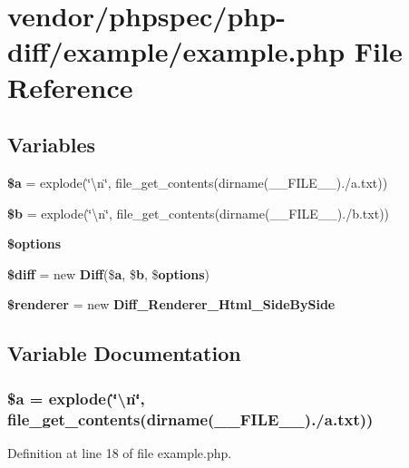 \section{vendor/phpspec/php-\/diff/example/example.php File Reference}
\label{phpspec_2php-diff_2example_2example_8php}
\subsection*{Variables}
\begin{DoxyCompactItemize}
\item 
{\bf \$a} = explode(\char`\"{}\textbackslash{}n\char`\"{}, file\+\_\+get\+\_\+contents(dirname(\+\_\+\+\_\+\+F\+I\+L\+E\+\_\+\+\_\+).\textquotesingle{}/a.\+txt\textquotesingle{}))
\item 
{\bf \$b} = explode(\char`\"{}\textbackslash{}n\char`\"{}, file\+\_\+get\+\_\+contents(dirname(\+\_\+\+\_\+\+F\+I\+L\+E\+\_\+\+\_\+).\textquotesingle{}/b.\+txt\textquotesingle{}))
\item 
{\bf \$options}
\item 
{\bf \$diff} = new {\bf Diff}(\${\bf a}, \${\bf b}, \${\bf options})
\item 
{\bf \$renderer} = new {\bf Diff\+\_\+\+Renderer\+\_\+\+Html\+\_\+\+Side\+By\+Side}
\end{DoxyCompactItemize}


\subsection{Variable Documentation}
\subsubsection[{\$a}]{\setlength{\rightskip}{0pt plus 5cm}\${\bf a} = explode(\char`\"{}\textbackslash{}n\char`\"{}, file\+\_\+get\+\_\+contents(dirname(\+\_\+\+\_\+\+F\+I\+L\+E\+\_\+\+\_\+).\textquotesingle{}/a.\+txt\textquotesingle{}))}\label{phpspec_2php-diff_2example_2example_8php_acebf83966ef6d7e5645a6b62ba368f9f}


Definition at line 18 of file example.\+php.

